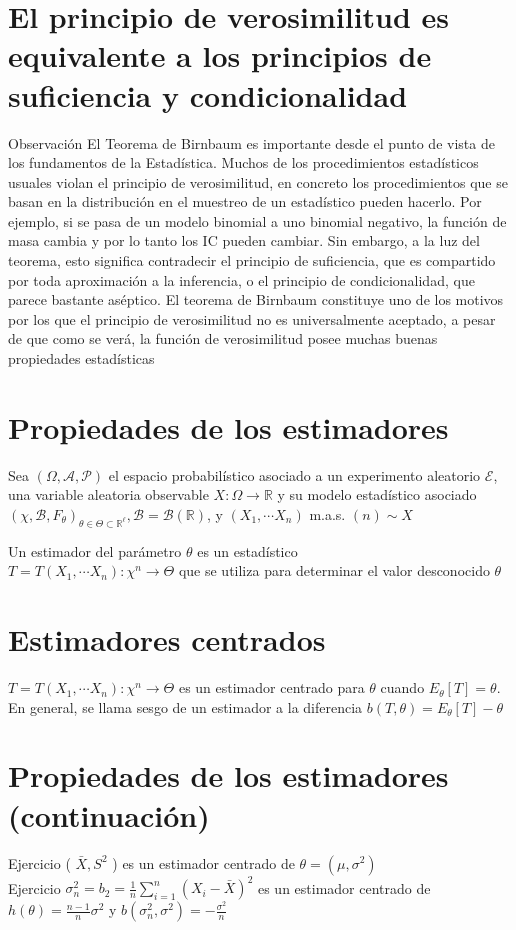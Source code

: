 \section*{El principio de verosimilitud es equivalente a los principios de suficiencia y condicionalidad}
Observación El Teorema de Birnbaum es importante desde el punto de vista de los fundamentos de la Estadística. Muchos de los procedimientos estadísticos usuales violan el principio de verosimilitud, en concreto los procedimientos que se basan en la distribución en el muestreo de un estadístico pueden hacerlo. Por ejemplo, si se pasa de un modelo binomial a uno binomial negativo, la función de masa cambia y por lo tanto los IC pueden cambiar. Sin embargo, a la luz del teorema, esto significa contradecir el principio de suficiencia, que es compartido por toda aproximación a la inferencia, o el principio de condicionalidad, que parece bastante aséptico. El teorema de Birnbaum constituye uno de los motivos por los que el principio de verosimilitud no es universalmente aceptado, a pesar de que como se verá, la función de verosimilitud posee muchas buenas propiedades estadísticas

\section*{Propiedades de los estimadores}
Sea $(\Omega, \mathcal{A}, \mathcal{P})$ el espacio probabilístico asociado a un experimento aleatorio $\mathcal{E}$, una variable aleatoria observable $X: \Omega \longrightarrow \mathbb{R}$ y su modelo estadístico asociado $\left(\chi, \mathcal{B}, F_{\theta}\right)_{\theta \in \Theta \subset \mathbb{R}^{\ell}}, \mathcal{B}=\mathcal{B}(\mathbb{R})$, y $\left(X_{1}, \cdots X_{n}\right)$ m.a.s. $(n) \sim X$

Un estimador del parámetro $\theta$ es un estadístico\\
$T=T\left(X_{1}, \cdots X_{n}\right): \chi^{n} \longrightarrow \Theta$ que se utiliza para determinar el valor desconocido $\theta$

\section*{Estimadores centrados}
$T=T\left(X_{1}, \cdots X_{n}\right): \chi^{n} \longrightarrow \Theta$ es un estimador centrado para $\theta$ cuando $E_{\theta}[T]=\theta$. En general, se llama sesgo de un estimador a la diferencia $b(T, \theta)=E_{\theta}[T]-\theta$

\section*{Propiedades de los estimadores (continuación)}
Ejercicio ( $\bar{X}, S^{2}$ ) es un estimador centrado de $\theta=\left(\mu, \sigma^{2}\right)$\\
Ejercicio $\sigma_{n}^{2}=b_{2}=\frac{1}{n} \sum_{i=1}^{n}\left(X_{i}-\bar{X}\right)^{2}$ es un estimador centrado de $h(\theta)=\frac{n-1}{n} \sigma^{2}$ y $b\left(\sigma_{n}^{2}, \sigma^{2}\right)=-\frac{\sigma^{2}}{n}$

